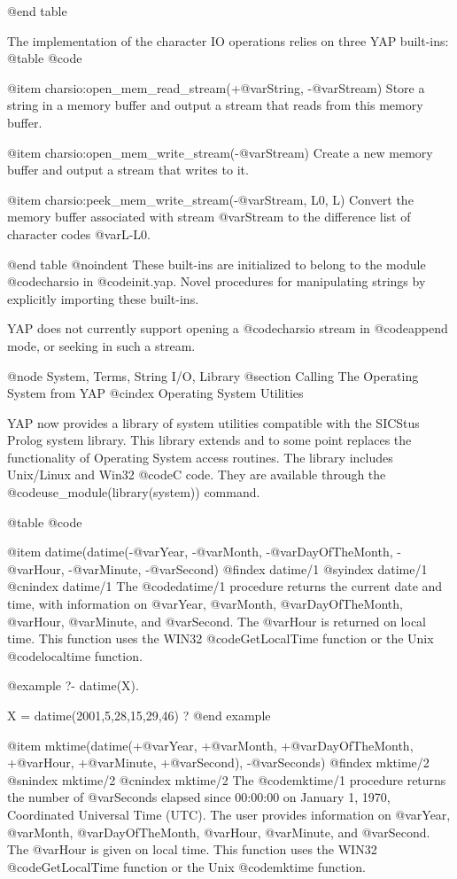{{{{{{{{@end table

The implementation of the character IO operations relies on three YAP
built-ins:
@table @code

@item charsio:open_mem_read_stream(+@var{String}, -@var{Stream})
Store a string in a memory buffer and output a stream that reads from this
memory buffer.

@item charsio:open_mem_write_stream(-@var{Stream})
Create a new memory buffer and output a stream that writes to  it.

@item charsio:peek_mem_write_stream(-@var{Stream}, L0, L)
Convert the memory buffer associated with stream @var{Stream} to the
difference list of character codes @var{L-L0}.

@end table
@noindent
These built-ins are initialized to belong to the module @code{charsio} in
@code{init.yap}. Novel procedures for manipulating strings by explicitly
importing these built-ins.

YAP does not currently support opening a @code{charsio} stream in
@code{append} mode, or seeking in such a stream.

@node System, Terms, String I/O, Library
@section Calling The Operating System from YAP
@cindex Operating System Utilities

YAP now provides a library of system utilities compatible with the
SICStus Prolog system library. This library extends and to some point
replaces the functionality of Operating System access routines. The
library includes Unix/Linux and Win32 @code{C} code. They
are available through the @code{use_module(library(system))} command.

@table @code

@item datime(datime(-@var{Year}, -@var{Month}, -@var{DayOfTheMonth},
-@var{Hour}, -@var{Minute}, -@var{Second})
@findex  datime/1
@syindex datime/1
@cnindex datime/1
The @code{datime/1} procedure returns the current date and time, with
information on @var{Year}, @var{Month}, @var{DayOfTheMonth},
@var{Hour}, @var{Minute}, and @var{Second}. The @var{Hour} is returned
on local time. This function uses the WIN32
@code{GetLocalTime} function or the Unix @code{localtime} function.

@example
   ?- datime(X).

X = datime(2001,5,28,15,29,46) ? 
@end example

@item mktime(datime(+@var{Year}, +@var{Month}, +@var{DayOfTheMonth},
+@var{Hour}, +@var{Minute}, +@var{Second}), -@var{Seconds})
@findex  mktime/2
@snindex mktime/2
@cnindex mktime/2
The @code{mktime/1} procedure returns the number of @var{Seconds}
elapsed since 00:00:00 on January 1, 1970, Coordinated Universal Time
(UTC).  The user provides information on @var{Year}, @var{Month},
@var{DayOfTheMonth}, @var{Hour}, @var{Minute}, and @var{Second}. The
@var{Hour} is given on local time. This function uses the WIN32
@code{GetLocalTime} function or the Unix @code{mktime} function.

}}}}}}}}
